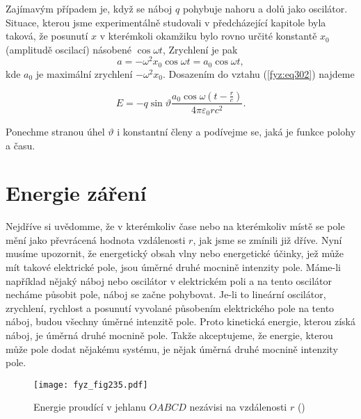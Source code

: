 {    Zajímavým případem je, když se náboj \(q\) pohybuje nahoru a dolů jako oscilátor. Situace, 
    kterou jsme experimentálně studovali v předcházející kapitole byla taková, že posunutí \(x\) v 
    kterémkoli okamžiku bylo rovno určité konstantě \(x_0\) (amplitudě oscilací) násobené \(\cos 
    \omega t\), Zrychlení je pak
    \begin{equation}\label{fyz:eq303}
      a = -\omega^2x_0\cos\omega t = a_0\cos\omega t,
    \end{equation}
    kde \(a_0\) je maximální zrychlení \(-\omega^2x_0\). Dosazením do vztahu (\ref{fyz:eq302}) 
    najdeme

    \begin{equation}\label{fyz:eq304}
      E = -q\sin\vartheta\frac{a_0\cos\omega\left(t-\frac{r}{c}\right)}{4\pi\varepsilon_0rc^2}.
    \end{equation}
    
    Ponechme stranou úhel \(\vartheta\) i konstantní členy a podívejme se, jaká je funkce polohy a 
    času.
    
  \section{Energie záření}\label{fyz:IchapXXIXsecII}
    Nejdříve si uvědomme, že v kterémkoliv čase nebo na kterémkoliv místě se pole mění jako 
    převrácená hodnota vzdálenosti \(r\), jak jsme se zmínili již dříve. Nyní musíme upozornit, že 
    energetický obsah vlny nebo energetické účinky, jež může mít takové elektrické pole, jsou 
    úměrné druhé mocnině intenzity pole. Máme-li například nějaký náboj nebo oscilátor v 
    elektrickém poli a na tento oscilátor necháme působit pole, náboj se začne pohybovat. Je-li to 
    lineární oscilátor, zrychlení, rychlost a posunutí vyvolané působením elektrického pole na 
    tento náboj, budou všechny úměrné intenzitě pole. Proto kinetická energie, kterou získá náboj, 
    je úměrná druhé mocnině pole. Takže akceptujeme, že energie, kterou může pole dodat nějakému 
    systému, je nějak úměrná druhé mocnině intenzity pole.

    \begin{figure}[ht!] %
      \centering
      \texttt{[image: fyz\_fig235.pdf]}
      \caption{Energie proudící v jehlanu \(OABCD\) nezávisi na vzdálenosti \(r\)
               (\cite[s.~381]{Feynman01})}
      \label{fyz:fig235}
    \end{figure}
    
}
